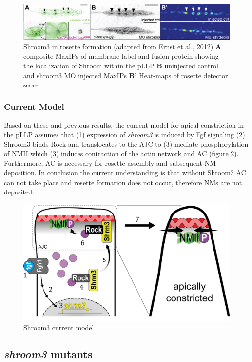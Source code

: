 \documentclass[11pt,singlespacinge,twoside]{reedthesis} %
\begin{document}
\begin{figure}

{\centering \includegraphics[width=.95\textwidth]{figures/intro/shrm_ernst} 

}

\caption[Shroom3 in rosette formation]{Shroom3 in rosette formation (adapted from Ernst et al., 2012) \textbf{A} composite MaxIPs of membrane label and fusion protein showing the localization of Shroom within the pLLP \textbf{B} uninjected control and shroom3 MO injected MaxIPs \textbf{B'} Heat-maps of rosette detector score.}\label{fig:shrmernst}
\end{figure}
\hypertarget{current-model}{%
\subsubsection{Current Model}\label{current-model}}

Based on these and previous results, the current model for apical constriction in the pLLP assumes that (1) expression of \emph{shroom3} is induced by Fgf signaling (2) Shroom3 binds Rock and translocates to the AJC to (3) mediate phosphorylation of NMII which (3) induces contraction of the actin network and AC (figure \ref{fig:shrmmodel}). Furthermore, AC is necessary for rosette assembly and subsequent NM deposition. In conclusion the current understanding is that without Shroom3 AC can not take place and rosette formation does not occur, therefore NMs are not deposited.


\begin{figure}

{\centering \includegraphics[width=.70\textwidth]{figures/intro/shrm_model} 

}

\caption{Shroom3 current model}\label{fig:shrmmodel}
\end{figure}
\hypertarget{shroom3-mutants}{%
\subsection{\texorpdfstring{\emph{shroom3} mutants}{shroom3 mutants}}\label{shroom3-mutants}}
\end{document}
